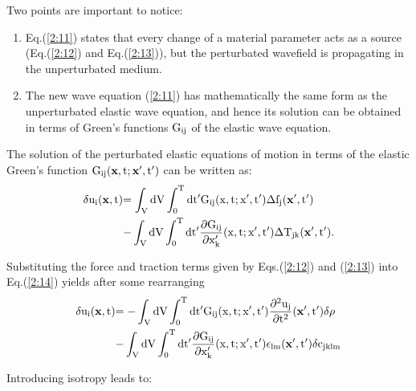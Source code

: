 Two points are important to notice: 
\begin{enumerate}
\item Eq.(\ref{2:11}) states that every change of a material parameter acts as a source 
(Eq.(\ref{2:12}) and Eq.(\ref{2:13})), but the perturbated wavefield is propagating in the unperturbated medium. 
\item The new wave equation (\ref{2:11}) has mathematically the same form as the unperturbated elastic wave equation, and hence its solution can be obtained in terms of
Green's functions $\rm{G_{ij}}$ of the elastic wave equation. 
\end{enumerate}
The solution of the perturbated elastic equations of motion  in terms of the elastic Green's function $\rm{G_{ij}(\mathbf{x},t;\mathbf{x'},t')}$ can be written as: 
\begin{equation}
\begin{split}
\rm{\delta u_i(\mathbf{x},t)} & \rm{= \int_V dV \int_0^T dt' G_{ij}(x,t;x',t')\Delta f_j(\mathbf{x'},t')}\\ 
& \rm{- \int_V dV \int_0^T dt' \frac{\partial G_{ij}}{\partial x'_k}(x,t;x',t')\Delta T_{jk}(\mathbf{x'},t').}
\end{split}
\label{2:14}
\end{equation} 

Substituting the force and traction terms given by Eqs.(\ref{2:12}) and (\ref{2:13}) into Eq.(\ref{2:14}) yields after some rearranging
\begin{equation}
\begin{split}
\rm{\delta u_i(\mathbf{x},t)} & \rm{= -\int_V dV \int_0^T dt' G_{ij}(x,t;x',t') \frac{\partial^2 u_j}{\partial t^2}(\mathbf{x'},t') \delta \rho}\\ 
& \rm{- \int_V dV \int_0^T dt' \frac{\partial G_{ij}}{\partial x'_k}(x,t;x',t') \epsilon_{lm}(\mathbf{x'},t') \delta c_{jklm}}
\end{split}
\label{adj2:20}
\end{equation}

Introducing isotropy 
leads to:

